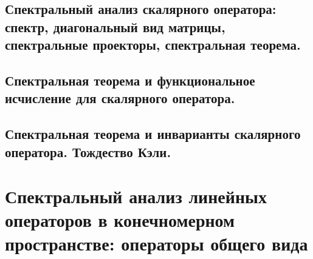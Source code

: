 \subsection{Спектральный анализ скалярного оператора: спектр, диагональный вид матрицы, спектральные проекторы, спектральная теорема.}



\subsection{Спектральная теорема и функциональное исчисление для скалярного оператора.}

\subsection{Спектральная теорема и инварианты скалярного оператора. Тождество Кэли.}



\section{Спектральный анализ линейных операторов в конечномерном пространстве: операторы общего вида}

